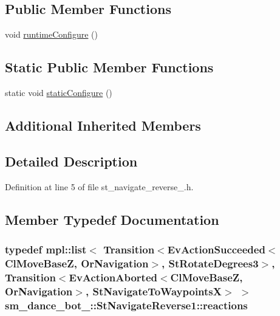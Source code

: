 \subsection*{Public Member Functions}
\begin{DoxyCompactItemize}
\item 
void \hyperlink{structsm__dance__bot__3_1_1StNavigateReverse1_a29e07d7168a016af733ae32e4925e046}{runtime\+Configure} ()
\end{DoxyCompactItemize}
\subsection*{Static Public Member Functions}
\begin{DoxyCompactItemize}
\item 
static void \hyperlink{structsm__dance__bot__3_1_1StNavigateReverse1_af8441ecc0a1222bbae76401bdac22ffe}{static\+Configure} ()
\end{DoxyCompactItemize}
\subsection*{Additional Inherited Members}


\subsection{Detailed Description}


Definition at line 5 of file st\+\_\+navigate\+\_\+reverse\+\_.\+h.



\subsection{Member Typedef Documentation}
\subsubsection[{\texorpdfstring{reactions}{reactions}}]{\setlength{\rightskip}{0pt plus 5cm}typedef mpl\+::list$<$ Transition$<$Ev\+Action\+Succeeded$<${\bf Cl\+Move\+BaseZ}, {\bf Or\+Navigation}$>$, {\bf St\+Rotate\+Degrees3}$>$, Transition$<$Ev\+Action\+Aborted$<${\bf Cl\+Move\+BaseZ}, {\bf Or\+Navigation}$>$, {\bf St\+Navigate\+To\+WaypointsX}$>$ $>$ {\bf sm\+\_\+dance\+\_\+bot\+\_\+::\+St\+Navigate\+Reverse1\+::reactions}}\hypertarget{structsm__dance__bot__3_1_1StNavigateReverse1_a17b7a59bdbfad23cdc323c09edd5a21c}{}\label{structsm__dance__bot__3_1_1StNavigateReverse1_a17b7a59bdbfad23cdc323c09edd5a21c}


